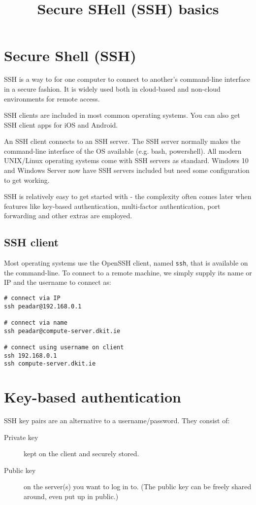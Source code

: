 \documentclass{pgnotes}
\title{Secure SHell (SSH) basics}
\begin{document}
\maketitle

\section{Secure Shell (SSH)}

SSH is a way to for one computer to connect to another's command-line interface in a secure fashion.
It is widely used both in cloud-based and non-cloud environments for remote access.

SSH clients are included in most common operating systems.
You can also get SSH client apps for iOS and Android.

An SSH client connects to an SSH server.
The SSH server normally makes the command-line interface of the OS available (e.g. bash, powershell).
All modern UNIX/Linux operating systems come with SSH servers as standard.
Windows 10 and Windows Server now have SSH servers included but need some configuration to get working.

SSH is relatively easy to get started with - the complexity often comes later when features like key-based authentication, multi-factor authentication, port forwarding and other extras are employed.

\subsection{SSH client}

Most operating systems use the OpenSSH client, named \texttt{ssh}, that is available on the command-line.
To connect to a remote machine, we simply supply its name or IP and the username to connect as:
\begin{verbatim}
# connect via IP
ssh peadar@192.168.0.1

# connect via name
ssh peadar@compute-server.dkit.ie

# connect using username on client
ssh 192.168.0.1
ssh compute-server.dkit.ie
\end{verbatim}

\section{Key-based authentication}

SSH key pairs are an alternative to a username/password. They consist of:
\begin{description}
\item[Private key] kept on the client and securely stored.
\item[Public key] on the server(s) you want to log in to. (The public key can be freely shared around, even put up in public.)
\end{description}
\end{document}
